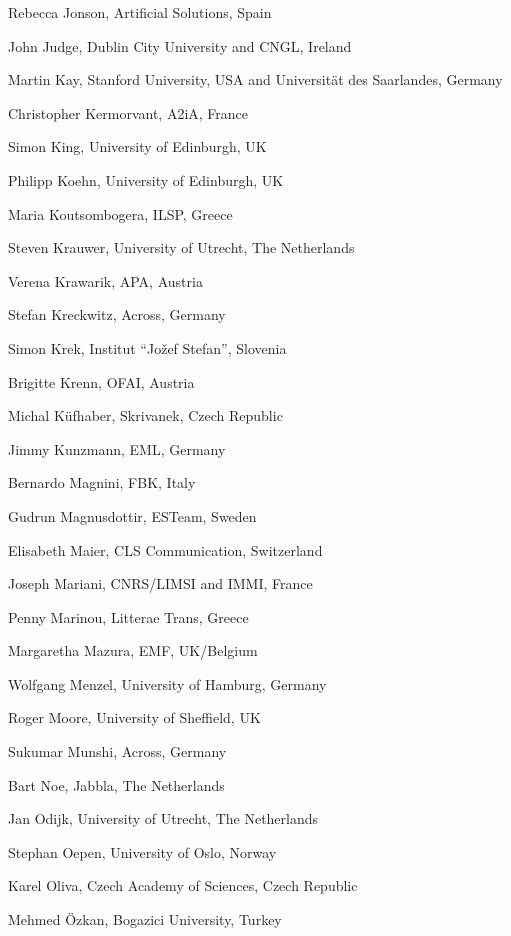 \documentclass[10pt, plain]{../../metanetpaper}
\begin{document}
\begin{multicols}{3}
\begin{small}
\begin{enumerate}
{      \item Rebecca Jonson, Artificial Solutions, Spain
      \item John Judge, Dublin City University and CNGL, Ireland
      \item Martin Kay, Stanford University, USA and Universität des Saarlandes, Germany
      \item Christopher Kermorvant, A2iA, France
      \item Simon King, University of Edinburgh, UK
      \item Philipp Koehn, University of Edinburgh, UK
      \item Maria Koutsombogera, ILSP, Greece
      \item Steven Krauwer, University of Utrecht, The Netherlands
      \item Verena Krawarik, APA, Austria
      \item Stefan Kreckwitz, Across, Germany
      \item Simon Krek, Institut ``Jožef Stefan'', Slovenia
      \item Brigitte Krenn, OFAI, Austria
      \item Michal Küfhaber, Skrivanek, Czech Republic
      \item Jimmy Kunzmann, EML, Germany
      \item Bernardo Magnini, FBK, Italy
      \item Gudrun Magnusdottir, ESTeam, Sweden
      \item Elisabeth Maier, CLS Communication, Switzerland
      \item Joseph Mariani, CNRS/LIMSI and IMMI, France
      \item Penny Marinou, Litterae Trans, Greece
      \item Margaretha Mazura, EMF, UK/Belgium
      \item Wolfgang Menzel, University of Hamburg, Germany
      \item Roger Moore, University of Sheffield, UK
      \item Sukumar Munshi, Across, Germany
      \item Bart Noe, Jabbla, The Netherlands
      \item Jan Odijk, University of Utrecht, The Netherlands
      \item Stephan Oepen, University of Oslo, Norway
      \item Karel Oliva, Czech Academy of Sciences, Czech Republic
      \item Mehmed Özkan, Bogazici University, Turkey
}
\end{enumerate}
\end{small}
\end{multicols}
\end{document}
